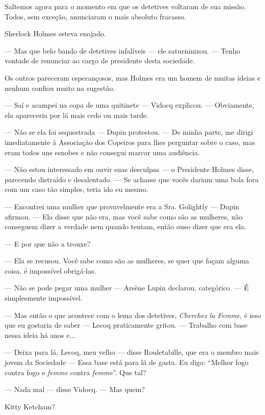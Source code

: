 Saltemos agora para o momento em que os detetives voltaram de sua
missão. Todos, sem exceção, anunciaram o mais absoluto fracasso.

Sherlock Holmes esteva enojado.

--- Mas que belo bando de detetives infalíveis --- ele saturninizou. ---
Tenho vontade de renunciar ao cargo de presidente desta sociedade.

Os outros pareceram esperançosos, mas Holmes era um homem de muitas
ideias e nenhum confiou muito na sugestão.

--- Saí e acampei na copa de uma quitinete --- Vidocq explicou. ---
Obviamente, ela apareceria por lá mais cedo ou mais tarde.

--- Não se ela foi sequestrada --- Dupin protestou. --- De minha parte,
me dirigi imediatamente à Associação dos Copeiros para lhes perguntar
sobre o caso, mas eram todos uns esnobes e não consegui marcar uma
audiência.

--- Não estou interessado em ouvir suas desculpas --- o Presidente
Holmes disse, parecendo distraído e desalentado. --- Se achasse que
vocês dariam uma bola fora com um caso tão simples, teria ido eu mesmo.

--- Encontrei uma mulher que provavelmente era a Sra. Golightly ---
Dupin afirmou. --- Ela disse que não era, mas você sabe como são as
mulheres, não conseguem dizer a verdade nem quando tentam, então ouso
dizer que era ela.

--- E por que não a trouxe?

--- Ela se recusou. Você sabe como são as mulheres, se quer que façam
alguma coisa, é impossível obrigá-las.

--- Não se pode pegar uma mulher --- Arsène Lupin declarou, categórico.
--- É simplesmente impossível.

--- Mas então o que acontece com o lema dos detetives, \emph{Cherchez la
Femme}, é isso que eu gostaria de saber --- Lecoq praticamente gritou.
--- Trabalho com base nessa ideia há anos e...

--- Deixa para lá, Lecoq, meu velho --- disse Rouletabille, que era o
membro mais jovem da Sociedade --- Essa base está para lá de gasta. Eu
digo: ``Melhor fogo contra fogo e \emph{femme} contra \emph{femme}''.
Que tal?

--- Nada mal --- disse Vidocq. --- Mas quem?



Kitty Ketcham?

